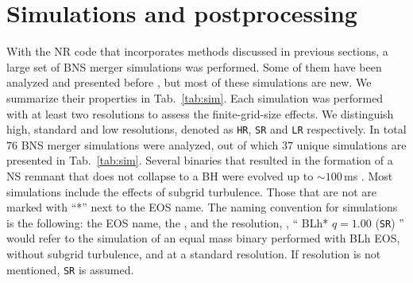 \section{Simulations and postprocessing} \label{sec:nr_methods:sims}


With the \ac{NR} code \wisky{} that incorporates methods discussed in 
previous sections, a large set of \ac{BNS} merger simulations was performed.
Some of them have been analyzed and presented before \citep{Perego:2019adq}, 
but most of these simulations are new. 
%
We summarize their properties in Tab.~\ref{tab:sim}. 
%
%
Each simulation was performed with at least two resolutions to assess the 
finite-grid-size effects. We distinguish high, standard and low resolutions, 
denoted as \texttt{HR}, \texttt{SR} and \texttt{LR} respectively. 
%
In total $76$ \ac{BNS} merger simulations were  analyzed, 
out of which $37$ unique simulations are presented in Tab.~\ref{tab:sim}. 
%
%
%
Several binaries that resulted in the formation of a \ac{NS} remnant 
that does not collapse to a \ac{BH} were evolved up to ${\sim}100\,$ms \pmerg.
%
Most simulations include the effects of subgrid turbulence. 
Those that are not are marked with ``*'' next to the \ac{EOS} name.
%
The naming convention for simulations is the following: 
the \ac{EOS} name, the \mr{}, and the resolution, \eg, 
`` BLh* $q=1.00$ (\texttt{SR}) '' would refer to the simulation of an 
equal mass binary performed with BLh \ac{EOS}, without subgrid 
turbulence, and at a standard resolution. 
If resolution is not mentioned, \texttt{SR} is assumed.

